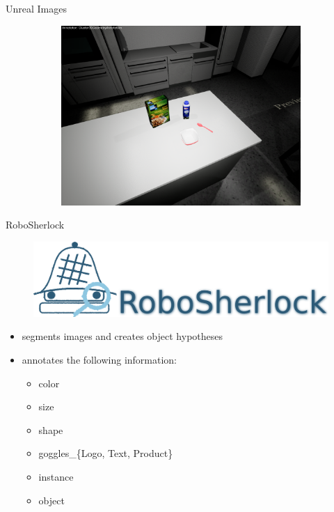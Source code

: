 \documentclass[]{beamer}
\begin{document}
\begin{frame}{Unreal Images}
\begin{figure}
\begin{subfigure}[b]{0.3\textwidth}
		\includegraphics[scale=.08]{../thesis/img/chapter3/sceneEx_5}	
	\end{subfigure}
\end{figure}
\end{frame}


\begin{frame}{RoboSherlock}
	\begin{figure}
		\includegraphics[scale=.3]{img/rs_logo_text.png}
	\end{figure}
	\begin{itemize}
		\item segments images and creates object hypotheses
		\item annotates the following information: 
		\begin{itemize}
			\item color
			\item size
			\item shape
			\item goggles\_\{Logo, Text, Product\}
			\item instance
			\item object
		\end{itemize}
	\end{itemize}
\end{frame}
\end{document}
